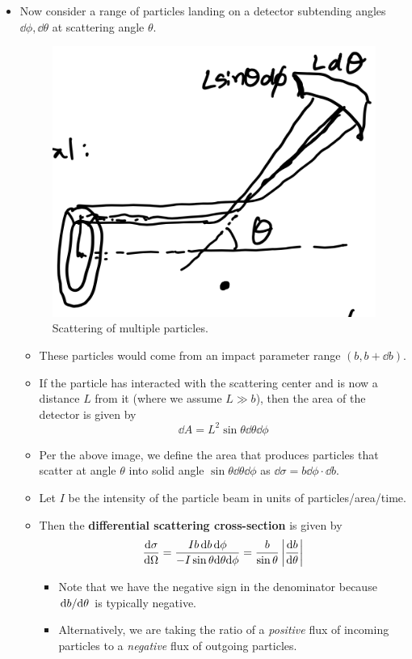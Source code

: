 \documentclass[../notes.tex]{subfiles}
\begin{document}
\begin{itemize}
\begin{itemize}
    \end{itemize}
    \item Now consider a range of particles landing on a detector subtending angles $\dd\phi,\dd\theta$ at scattering angle $\theta$.
    \begin{figure}[h!]
        \centering
        \includegraphics[width=0.3\linewidth]{../ExtFiles/scatteringMP.png}
        \caption{Scattering of multiple particles.}
        \label{fig:scatteringMP}
    \end{figure}
    \begin{itemize}
        \item These particles would come from an impact parameter range $(b,b+\dd{b})$.
        \item If the particle has interacted with the scattering center and is now a distance $L$ from it (where we assume $L\gg b$), then the area of the detector is given by
        \begin{equation*}
            \dd{A} = L^2\sin\theta\dd\theta\dd\phi
        \end{equation*}
        \item Per the above image, we define the area that produces particles that scatter at angle $\theta$ into solid angle $\sin\theta\dd\theta\dd\phi$ as $\dd\sigma=b\dd\phi\cdot\dd{b}$.
        \item Let $I$ be the intensity of the particle beam in units of particles/area/time.
        \item Then the \textbf{differential scattering cross-section} is given by
        \begin{equation*}
            \dv{\sigma}{\Omega} = \frac{Ib\dd{b}\dd\phi}{-I\sin\theta\dd\theta\dd\phi}
            = \frac{b}{\sin\theta}\left| \dv{b}{\theta} \right|
        \end{equation*}
        \begin{itemize}
            \item Note that we have the negative sign in the denominator because $\dv*{b}{\theta}$ is typically negative.
            \item Alternatively, we are taking the ratio of a \emph{positive} flux of incoming particles to a \emph{negative} flux of outgoing particles.

\end{itemize}
\end{itemize}
\end{itemize}
\end{document}
